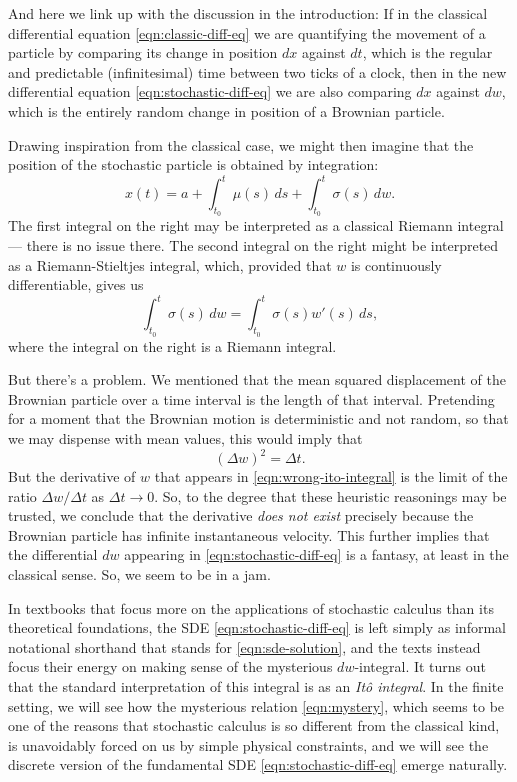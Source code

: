 \documentclass[11pt]{book}
\theoremstyle{definition}
\numberwithin{equation}{section}
\begin{document}
And here we link up with the discussion in the introduction: If in the classical differential equation \eqref{eqn:classic-diff-eq} we are quantifying the movement of a particle by comparing its change in position $dx$ against $dt$, which is the regular and predictable (infinitesimal) time between two ticks of a clock, then in the new differential equation \eqref{eqn:stochastic-diff-eq} we are also comparing $dx$ against $dw$, which is the entirely random change in position of a Brownian particle.

Drawing inspiration from the classical case, we might then imagine that the position of the stochastic particle is obtained by integration:
\begin{equation} \label{eqn:sde-solution}
	x(t) = a + \int_{t_0}^t \mu(s) \, ds + \int_{t_0}^t \sigma(s) \, dw.
\end{equation}
The first integral on the right may be interpreted as a classical Riemann integral --- there is no issue there. The second integral on the right might be interpreted as a Riemann-Stieltjes integral, which, provided that $w$ is continuously differentiable, gives us
\begin{equation} \label{eqn:wrong-ito-integral}
	\int_{t_0}^t \sigma(s) \, dw = \int_{t_0}^t \sigma(s) w'(s) \, ds,
\end{equation}
where the integral on the right is a Riemann integral.

But there's a problem. We mentioned that the mean squared displacement of the Brownian particle over a time interval is the length of that interval. Pretending for a moment that the Brownian motion is deterministic and not random, so that we may dispense with mean values, this would imply that
\begin{equation} \label{eqn:mystery}
	(\Delta w)^2 = \Delta t.
\end{equation}
But the derivative of $w$ that appears in \eqref{eqn:wrong-ito-integral} is the limit of the ratio $\Delta w / \Delta t$ as $\Delta t \to 0$. So, to the degree that these heuristic reasonings may be trusted, we conclude that the derivative \textit{does not exist} precisely because the Brownian particle has infinite instantaneous velocity. This further implies that the differential $dw$ appearing in \eqref{eqn:stochastic-diff-eq} is a fantasy, at least in the classical sense. So, we seem to be in a jam.

In textbooks that focus more on the applications of stochastic calculus than its theoretical foundations, the SDE \eqref{eqn:stochastic-diff-eq} is left simply as informal notational shorthand that stands for \eqref{eqn:sde-solution}, and the texts instead focus their energy on making sense of the mysterious $dw$-integral. It turns out that the standard interpretation of this integral is as an \textit{Itô integral}. In the finite setting, we will see how the mysterious relation \eqref{eqn:mystery}, which seems to be one of the reasons that stochastic calculus is so different from the classical kind, is unavoidably forced on us by simple physical constraints, and we will see the discrete version of the fundamental SDE \eqref{eqn:stochastic-diff-eq} emerge naturally.





\end{document}
